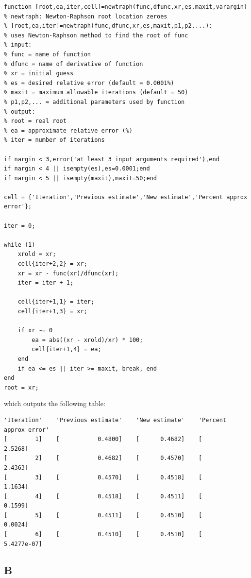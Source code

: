 \documentclass{article}
\begin{document}
\begin{lstlisting}
function [root,ea,iter,cell]=newtraph(func,dfunc,xr,es,maxit,varargin)
% newtraph: Newton-Raphson root location zeroes
% [root,ea,iter]=newtraph(func,dfunc,xr,es,maxit,p1,p2,...):
% uses Newton-Raphson method to find the root of func
% input:
% func = name of function
% dfunc = name of derivative of function
% xr = initial guess
% es = desired relative error (default = 0.0001%)
% maxit = maximum allowable iterations (default = 50)
% p1,p2,... = additional parameters used by function
% output:
% root = real root
% ea = approximate relative error (%)
% iter = number of iterations

if nargin < 3,error('at least 3 input arguments required'),end
if nargin < 4 || isempty(es),es=0.0001;end
if nargin < 5 || isempty(maxit),maxit=50;end

cell = {'Iteration','Previous estimate','New estimate','Percent approx error'};

iter = 0;

while (1)
    xrold = xr;
    cell{iter+2,2} = xr;
    xr = xr - func(xr)/dfunc(xr);
    iter = iter + 1;
    
    cell{iter+1,1} = iter;
    cell{iter+1,3} = xr;
   
    if xr ~= 0
        ea = abs((xr - xrold)/xr) * 100;
        cell{iter+1,4} = ea;
    end
    if ea <= es || iter >= maxit, break, end
end
root = xr;
\end{lstlisting}

\hspace{20pt}

\noindent which outputs the following table:

\begin{lstlisting}
'Iteration'    'Previous estimate'    'New estimate'    'Percent approx error' 
[        1]    [           0.4800]    [      0.4682]    [             2.5268]
[        2]    [           0.4682]    [      0.4570]    [             2.4363]
[        3]    [           0.4570]    [      0.4518]    [             1.1634]
[        4]    [           0.4518]    [      0.4511]    [             0.1599]
[        5]    [           0.4511]    [      0.4510]    [             0.0024]
[        6]    [           0.4510]    [      0.4510]    [         5.4277e-07]
\end{lstlisting}


\subsection*{B}
\end{document}
